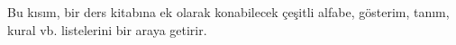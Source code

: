 \documentclass[../../include/open-logic-part]{subfiles}
\begin{document}

\begin{editorial}
  Bu kısım, bir ders kitabına ek olarak konabilecek çeşitli alfabe,
  gösterim, tanım, kural vb. listelerini bir araya getirir.
\end{editorial}



\OLEndPartHook
\end{document}
